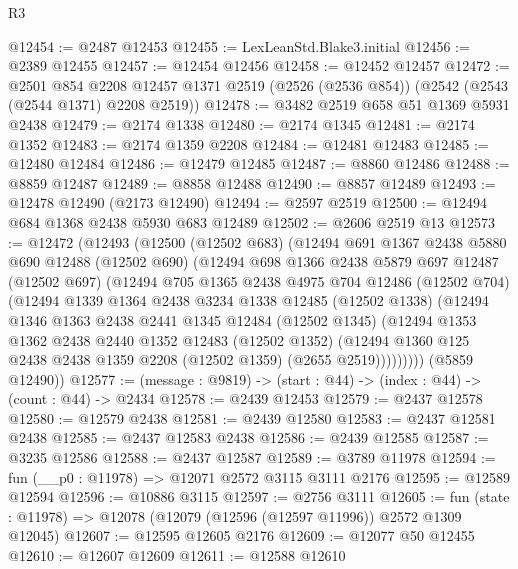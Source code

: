 \begin{lexlean}{R3}
\begin{coremodule}
@12454 := @2487 @12453
@12455 := LexLeanStd.Blake3.initial
@12456 := @2389 @12455
@12457 := @12454 @12456
@12458 := @12452 @12457
@12472 := @2501
    @854
    @2208
    @12457
    @1371
    @2519
    (@2526 (@2536 @854))
    (@2542 (@2543 (@2544 @1371) @2208 @2519))
@12478 := @3482 @2519 @658 @51 @1369 @5931 @2438
@12479 := @2174 @1338
@12480 := @2174 @1345
@12481 := @2174 @1352
@12483 := @2174 @1359 @2208
@12484 := @12481 @12483
@12485 := @12480 @12484
@12486 := @12479 @12485
@12487 := @8860 @12486
@12488 := @8859 @12487
@12489 := @8858 @12488
@12490 := @8857 @12489
@12493 := @12478 @12490 (@2173 @12490)
@12494 := @2597 @2519
@12500 := @12494 @684 @1368 @2438 @5930 @683 @12489
@12502 := @2606 @2519 @13
@12573 := @12472
    (@12493
      (@12500
        (@12502 @683)
        (@12494
          @691
          @1367
          @2438
          @5880
          @690
          @12488
          (@12502 @690)
          (@12494
            @698
            @1366
            @2438
            @5879
            @697
            @12487
            (@12502 @697)
            (@12494
              @705
              @1365
              @2438
              @4975
              @704
              @12486
              (@12502 @704)
              (@12494
                @1339
                @1364
                @2438
                @3234
                @1338
                @12485
                (@12502 @1338)
                (@12494
                  @1346
                  @1363
                  @2438
                  @2441
                  @1345
                  @12484
                  (@12502 @1345)
                  (@12494
                    @1353
                    @1362
                    @2438
                    @2440
                    @1352
                    @12483
                    (@12502 @1352)
                    (@12494 @1360 @125 @2438 @2438 @1359 @2208 (@12502 @1359) (@2655 @2519)))))))))
      (@5859 @12490))
@12577 := (message : @9819) -> (start : @44) -> (index : @44) -> (count : @44) -> @2434
@12578 := @2439 @12453
@12579 := @2437 @12578
@12580 := @12579 @2438
@12581 := @2439 @12580
@12583 := @2437 @12581 @2438
@12585 := @2437 @12583 @2438
@12586 := @2439 @12585
@12587 := @3235 @12586
@12588 := @2437 @12587
@12589 := @3789 @11978
@12594 := fun (__p0 : @11978) => @12071 @2572 @3115 @3111 @2176
@12595 := @12589 @12594
@12596 := @10886 @3115
@12597 := @2756 @3111
@12605 := fun (state : @11978) => @12078 (@12079 (@12596 (@12597 @11996)) @2572 @1309 @12045)
@12607 := @12595 @12605 @2176
@12609 := @12077 @50 @12455
@12610 := @12607 @12609
@12611 := @12588 @12610

\end{coremodule}
\end{lexlean}
